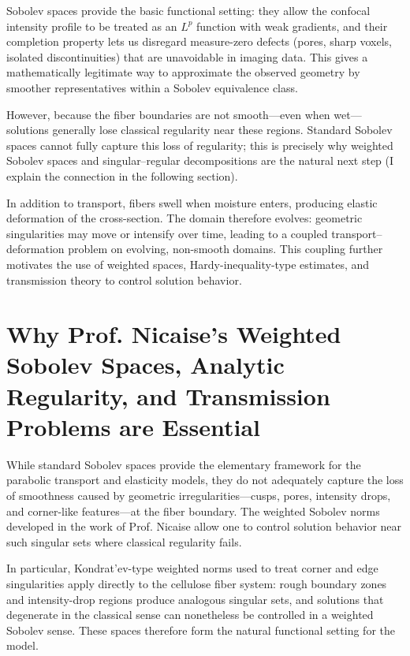 \documentclass[11pt]{article}
\begin{document}
Sobolev spaces provide the basic functional setting: they allow the confocal intensity profile to be treated as an $L^p$ function with weak gradients, and their completion property lets us disregard measure-zero defects (pores, sharp voxels, isolated discontinuities) that are unavoidable in imaging data. This gives a mathematically legitimate way to approximate the observed geometry by smoother representatives within a Sobolev equivalence class.

However, because the fiber boundaries are not smooth—even when wet—solutions generally lose classical regularity near these regions. Standard Sobolev spaces cannot fully capture this loss of regularity; this is precisely why weighted Sobolev spaces and singular–regular decompositions are the natural next step (I explain the connection in the following section).

In addition to transport, fibers swell when moisture enters, producing elastic deformation of the cross-section. The domain therefore evolves: geometric singularities may move or intensify over time, leading to a coupled transport–deformation problem on evolving, non-smooth domains. This coupling further motivates the use of weighted spaces, Hardy-inequality-type estimates, and transmission theory to control solution behavior.


\section{Why Prof. Nicaise’s Weighted Sobolev Spaces, Analytic Regularity, and Transmission Problems are Essential} 

While standard Sobolev spaces provide the elementary framework for the parabolic transport and elasticity models, they do not adequately capture the loss of smoothness caused by geometric irregularities—cusps, pores, intensity drops, and corner-like features—at the fiber boundary. The weighted Sobolev norms developed in the work of Prof. Nicaise allow one to control solution behavior near such singular sets where classical regularity fails.

In particular, Kondrat’ev-type weighted norms used to treat corner and edge singularities apply directly to the cellulose fiber system: rough boundary zones and intensity-drop regions produce analogous singular sets, and solutions that degenerate in the classical sense can nonetheless be controlled in a weighted Sobolev sense. These spaces therefore form the natural functional setting for the model.
\end{document}
